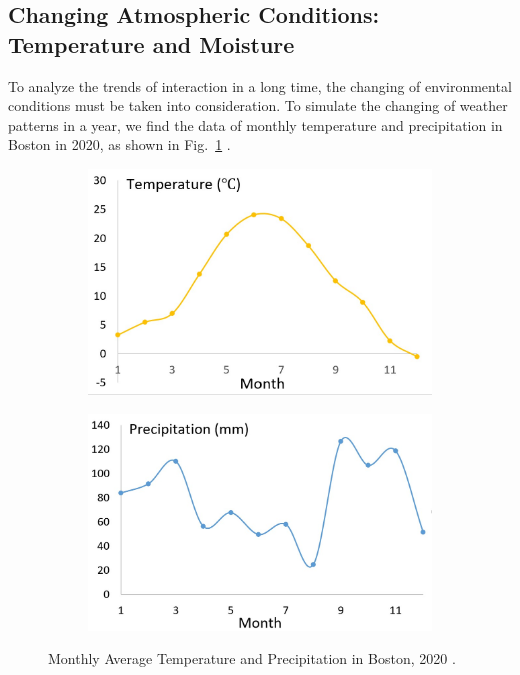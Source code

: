\documentclass[a4paper,12pt]{article}
\begin{document}
\subsection{Changing Atmospheric Conditions: Temperature and Moisture}
\par To analyze the trends of interaction in a long time, the changing of environmental conditions must be taken into consideration. To simulate the changing of weather patterns in a year, we find the data of monthly temperature and precipitation in Boston in 2020, as shown in Fig.~\ref{weather} \cite{weather}. 

\begin{figure}[H]
	\centering
	\begin{subfigure}{0.44\textwidth}
		\includegraphics[width=\textwidth]{./4/temp.jpg}
	\end{subfigure}
	\begin{subfigure}{0.45\textwidth}
		\includegraphics[width=\textwidth]{./4/precipitation.jpg}
	\end{subfigure}
	\caption{Monthly Average Temperature and Precipitation in Boston, 2020 \cite{weather}.}
	\label{weather}
\end{figure}
\end{document}
